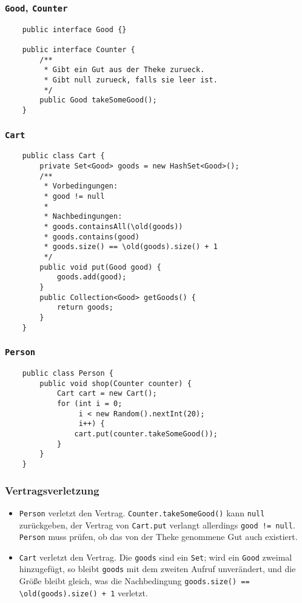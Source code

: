 \documentclass{beamer}
\begin{document}
\begin{frame}[fragile]
  \frametitle{\lstinline{Good}, \lstinline{Counter}}
  \begin{lstlisting}
    public interface Good {}
    
    public interface Counter {
        /**
         * Gibt ein Gut aus der Theke zurueck.
         * Gibt null zurueck, falls sie leer ist.
         */
        public Good takeSomeGood();
    }
  \end{lstlisting}
\end{frame}

\begin{frame}[fragile]
  \frametitle{\lstinline{Cart}}
  \begin{lstlisting}
    public class Cart {
        private Set<Good> goods = new HashSet<Good>();
        /**
         * Vorbedingungen:
         * good != null
         * 
         * Nachbedingungen:
         * goods.containsAll(\old(goods))
         * goods.contains(good)
         * goods.size() == \old(goods).size() + 1
         */
        public void put(Good good) {
            goods.add(good);
        }
        public Collection<Good> getGoods() {
            return goods;
        }
    }
  \end{lstlisting}
\end{frame}

\begin{frame}[fragile]
  \frametitle{\lstinline{Person}}
  \begin{lstlisting}
    public class Person {
        public void shop(Counter counter) {
            Cart cart = new Cart();
            for (int i = 0;
                 i < new Random().nextInt(20);
                 i++) {
                cart.put(counter.takeSomeGood());
            }
        }
    }
  \end{lstlisting}
\end{frame}

\begin{frame}[fragile]
  \frametitle{Vertragsverletzung}
  \begin{itemize}
  \item
    \lstinline{Person} verletzt den Vertrag.
    \lstinline{Counter.takeSomeGood()} kann \lstinline{null} zurückgeben,
    der Vertrag von \lstinline{Cart.put} verlangt allerdings \lstinline{good != null}.
    \lstinline{Person} muss prüfen, ob das von der Theke genommene Gut auch existiert.
    \pause
  \item
    \lstinline{Cart} verletzt den Vertrag.
    Die \lstinline{goods} sind ein \lstinline{Set};
    wird ein \lstinline{Good} zweimal hinzugefügt,
    so bleibt \lstinline{goods} mit dem zweiten Aufruf unverändert,
    und die Größe bleibt gleich,
    was die Nachbedingung \lstinline{goods.size() == \old(goods).size() + 1} verletzt.
  \end{itemize}
\end{frame}
\end{document}
